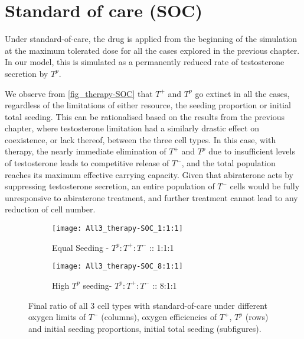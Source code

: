 \section{Standard of care (SOC)}
Under standard-of-care, the drug is applied from the beginning of the simulation at the maximum tolerated dose for all the cases explored in the previous chapter. In our model, this is simulated as a permanently reduced rate of testosterone secretion by $T^p$.

We observe from \autoref{fig_therapy-SOC} that $T^+$ and $T^p$ go extinct in all the cases, regardless of the limitations of either resource, the seeding proportion or initial total seeding. This can be rationalised based on the results from the previous chapter, where testosterone limitation had a similarly drastic effect on coexistence, or lack thereof, between the three cell types. In this case, with therapy, the nearly immediate elimination of $T^+$ and $T^p$ due to insufficient levels of testosterone leads to competitive release of $T^-$, and the total population reaches its maximum effective carrying capacity. Given that abiraterone acts by suppressing testosterone secretion, an entire population of $T^-$ cells would be fully unresponsive to abiraterone treatment, and further treatment cannot lead to any reduction of cell number.

\begin{figure}[h!]
  \centering
  \begin{subfigure}[b]{\textwidth}
    \centering
    \texttt{[image: All3\_therapy-SOC\_1:1:1]}
    \caption{Equal Seeding - $T^p:T^+:T^-$ :: 1:1:1}
    \label{fig_therapy-SOC_1:1:1}
  \end{subfigure}
  \begin{subfigure}[b]{\textwidth}
    \centering
    \texttt{[image: All3\_therapy-SOC\_8:1:1]}
    \caption{High $T^p$ seeding- $T^p:T^+:T^-$ :: 8:1:1}
    \label{fig_therapy-SOC_8:1:1}
  \end{subfigure}
  \caption[Final ratio of all 3 cell types with standard-of-care]{Final ratio of all 3 cell types with standard-of-care under different oxygen limits of $T^-$ (columns), oxygen efficiencies of $T^+$, $T^p$ (rows) and initial seeding proportions, initial total seeding (subfigures).}
  \label{fig_therapy-SOC}
\end{figure}

\newpage

